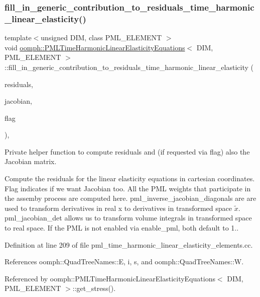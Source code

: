 \subsubsection{\texorpdfstring{fill\+\_\+in\+\_\+generic\+\_\+contribution\+\_\+to\+\_\+residuals\+\_\+time\+\_\+harmonic\+\_\+linear\+\_\+elasticity()}{fill\_in\_generic\_contribution\_to\_residuals\_time\_harmonic\_linear\_elasticity()}}
{\footnotesize\ttfamily template$<$unsigned D\+IM, class P\+M\+L\+\_\+\+E\+L\+E\+M\+E\+NT $>$ \\
void \hyperlink{classoomph_1_1PMLTimeHarmonicLinearElasticityEquations}{oomph\+::\+P\+M\+L\+Time\+Harmonic\+Linear\+Elasticity\+Equations}$<$ D\+IM, P\+M\+L\+\_\+\+E\+L\+E\+M\+E\+NT $>$\+::fill\+\_\+in\+\_\+generic\+\_\+contribution\+\_\+to\+\_\+residuals\+\_\+time\+\_\+harmonic\+\_\+linear\+\_\+elasticity (\begin{DoxyParamCaption}\item[{\hyperlink{classoomph_1_1Vector}{Vector}$<$ double $>$ \&}]{residuals,  }\item[{\hyperlink{classoomph_1_1DenseMatrix}{Dense\+Matrix}$<$ double $>$ \&}]{jacobian,  }\item[{unsigned}]{flag }\end{DoxyParamCaption})\hspace{0.3cm}{\ttfamily [private]}, {\ttfamily [virtual]}}



Private helper function to compute residuals and (if requested via flag) also the Jacobian matrix. 

Compute the residuals for the linear elasticity equations in cartesian coordinates. Flag indicates if we want Jacobian too. All the P\+ML weights that participate in the assemby process are computed here. pml\+\_\+inverse\+\_\+jacobian\+\_\+diagonals are are used to transform derivatives in real x to derivatives in transformed space $\tilde x $. pml\+\_\+jacobian\+\_\+det allows us to transform volume integrals in transformed space to real space. If the P\+ML is not enabled via enable\+\_\+pml, both default to 1.. 

Definition at line 209 of file pml\+\_\+time\+\_\+harmonic\+\_\+linear\+\_\+elasticity\+\_\+elements.\+cc.



References oomph\+::\+Quad\+Tree\+Names\+::E, i, s, and oomph\+::\+Quad\+Tree\+Names\+::W.



Referenced by oomph\+::\+P\+M\+L\+Time\+Harmonic\+Linear\+Elasticity\+Equations$<$ D\+I\+M, P\+M\+L\+\_\+\+E\+L\+E\+M\+E\+N\+T $>$\+::get\+\_\+stress().

